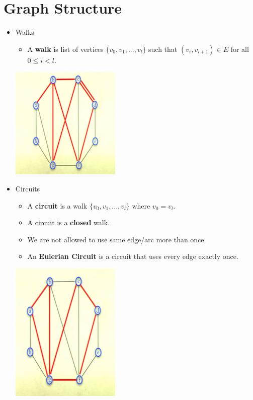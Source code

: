 \documentclass[12pt]{article}
\begin{document}
\section{Graph Structure}
\renewcommand{\labelitemii}{$\circ$}
\renewcommand{\labelitemiii}{$\cdot$}
\renewcommand{\labelitemiii}{$\rightarrow$}
\renewcommand{\labelitemiv}{$\star$}
\begin{itemize}
\item Walks
	\begin{itemize}
	\item A \textbf{walk} is list of vertices $\{v_0, v_1, ... , v_l\}$ such that $(v_i, v_{i+1}) \in E$ for all $0 \leq i < l.$
	\end{itemize}
\begin{center}
\includegraphics{lecture77}
\end{center}

\item Circuits
	\begin{itemize}
	\item A \textbf{circuit} is a walk $\{v_0, v_1, ... , v_l\}$ where $v_0 = v_l$.
	\item A circuit is a \textbf{closed} walk.
	\item We are not allowed to use same edge/arc more than once.
	\item An \textbf{Eulerian Circuit} is a circuit that uses every edge exactly once.
	\end{itemize}
\begin{center}
\includegraphics{lecture78}
\end{center}
	

\end{itemize}
\end{document}
